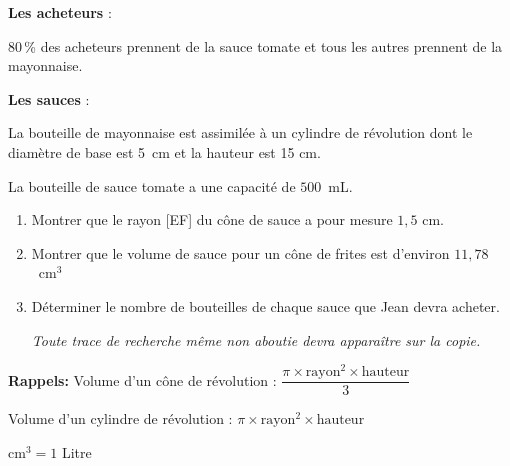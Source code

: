 \medskip

\textbf{Les acheteurs }: 

80\,\% des acheteurs prennent de la sauce tomate et tous les autres prennent de la mayonnaise. 
 
\medskip

\textbf{Les sauces} : 

La bouteille de mayonnaise est assimilée à un cylindre de révolution dont le diamètre de base est 5~cm et la hauteur est 15 cm. 

La bouteille de sauce tomate a une capacité de $500$~mL. 

\medskip

\begin{enumerate}
\item Montrer que le rayon [EF] du cône de sauce a pour mesure $1,5$ cm. 
\item Montrer que le volume de sauce pour un cône de frites est d'environ $11,78$~cm$^3$ 
\item Déterminer le nombre de bouteilles de chaque sauce que Jean devra acheter. 

\emph{Toute trace de recherche même non aboutie devra apparaître sur la copie.} 
\end{enumerate}

\medskip

\textbf{Rappels: } Volume d'un cône de révolution : $\dfrac{\pi \times \text{rayon}^2 \times \text{hauteur}}{3}$

\phantom{Rappels: } Volume d'un cylindre de révolution  : $\pi \times  \text{rayon}^2 \times \text{hauteur}$ 

\phantom{Rappels: }  cm$^3 = 1$ Litre 

